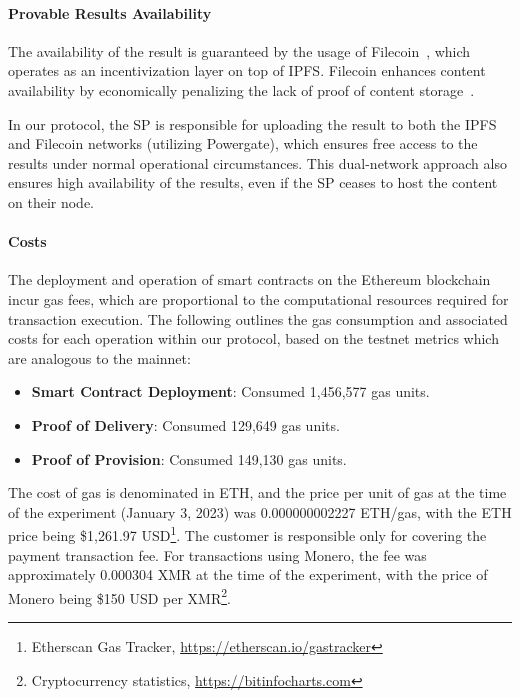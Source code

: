 \documentclass[pdftex,twocolumn,epjc3]{svjour3}
\begin{document}
{\paragraph{Provable Results Availability}\label{sec:provable-results-availability}
The availability of the result is guaranteed by the usage of Filecoin~\cite{protocollabsFilecoinDecentralizedStorage2017}, which operates as an incentivization layer on top of IPFS. Filecoin enhances content availability by economically penalizing the lack of proof of content storage~\cite{filecoinSlashing}.

In our protocol, the SP is responsible for uploading the result to both the IPFS and Filecoin networks (utilizing Powergate), which ensures free access to the results under normal operational circumstances. This dual-network approach also ensures high availability of the results, even if the SP ceases to host the content on their node.

\paragraph{Costs}
The deployment and operation of smart contracts on the Ethereum blockchain incur gas fees, which are proportional to the computational resources required for transaction execution. The following outlines the gas consumption and associated costs for each operation within our protocol, based on the testnet metrics which are analogous to the mainnet:

\begin{itemize}
    \item \textbf{Smart Contract Deployment}: Consumed 1,456,577 gas units.
    \item \textbf{Proof of Delivery}: Consumed 129,649 gas units.
    \item \textbf{Proof of Provision}: Consumed 149,130 gas units.
\end{itemize}

The cost of gas is denominated in ETH, and the price per unit of gas at the time of the experiment (January 3, 2023) was 0.000000002227 ETH/gas, with the ETH price being \$1,261.97 USD\footnote{Etherscan Gas Tracker, \url{https://etherscan.io/gastracker}}.
The customer is responsible only for covering the payment transaction fee. For transactions using Monero, the fee was approximately 0.000304 XMR at the time of the experiment, with the price of Monero being \$150 USD per XMR\footnote{Cryptocurrency statistics, \url{https://bitinfocharts.com}}.

}
\end{document}
